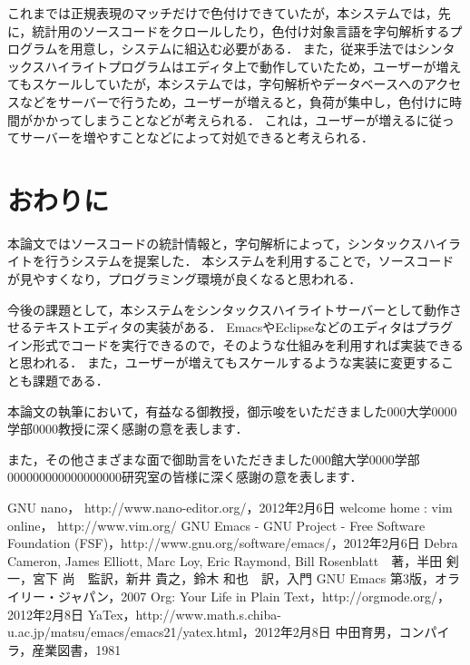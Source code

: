 \documentclass{cs-thesis}
\begin{document}

  これまでは正規表現のマッチだけで色付けできていたが，本システムでは，先に，統計用のソースコードをクロールしたり，色付け対象言語を字句解析するプログラムを用意し，システムに組込む必要がある．
  また，従来手法ではシンタックスハイライトプログラムはエディタ上で動作していたため，ユーザーが増えてもスケールしていたが，本システムでは，字句解析やデータベースへのアクセスなどをサーバーで行うため，ユーザーが増えると，負荷が集中し，色付けに時間がかかってしまうことなどが考えられる．
  これは，ユーザーが増えるに従ってサーバーを増やすことなどによって対処できると考えられる．


  \clearpage
 \section{おわりに}
 本論文ではソースコードの統計情報と，字句解析によって，シンタックスハイライトを行うシステムを提案した．
 本システムを利用することで，ソースコードが見やすくなり，プログラミング環境が良くなると思われる．

 今後の課題として，本システムをシンタックスハイライトサーバーとして動作させるテキストエディタの実装がある．
 EmacsやEclipseなどのエディタはプラグイン形式でコードを実行できるので，そのような仕組みを利用すれば実装できると思われる．
 また，ユーザーが増えてもスケールするような実装に変更することも課題である．

 \acknowledgement
 本論文の執筆において，有益なる御教授，御示唆をいただきました000大学0000学部0000教授に深く感謝の意を表します．

 また，その他さまざまな面で御助言をいただきました000館大学0000学部000000000000000000研究室の皆様に深く感謝の意を表します．

  \clearpage

  \begin{thebibliography}{9}
    GNU nano， http://www.nano-editor.org/，2012年2月6日
    welcome home : vim online， http://www.vim.org/
    GNU Emacs - GNU Project - Free Software Foundation (FSF)，http://www.gnu.org/software/emacs/，2012年2月6日
    Debra Cameron, James Elliott, Marc Loy, Eric Raymond, Bill Rosenblatt　著，半田 剣一，宮下 尚　監訳，新井 貴之，鈴木 和也　訳，入門 GNU Emacs 第3版，オライリー・ジャパン，2007
    Org: Your Life in Plain Text，http://orgmode.org/，2012年2月8日
    YaTex，http://www.math.s.chiba-u.ac.jp/matsu/emacs/emacs21/yatex.html，2012年2月8日
    中田育男，コンパイラ，産業図書，1981
  \end{thebibliography}
\end{document}
